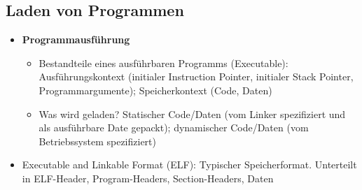 \subsection{Laden von Programmen}
\begin{itemize}
	\item \textbf{Programmausführung}
	\begin{itemize}
		\item Bestandteile eines ausführbaren Programms (Executable): Ausführungskontext (initialer Instruction Pointer, initialer Stack Pointer, Programmargumente); Speicherkontext (Code, Daten)
		\item Was wird geladen? Statischer Code/Daten (vom Linker spezifiziert und als ausführbare Date gepackt); dynamischer Code/Daten (vom Betriebssystem spezifiziert)
	\end{itemize}
	\item Executable and Linkable Format (ELF): Typischer Speicherformat. Unterteilt in ELF-Header, Program-Headers, Section-Headers, Daten
\end{itemize}


